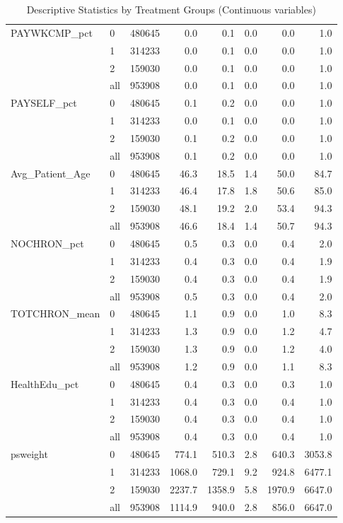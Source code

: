 \begin{table}[ht]
{\begin{tabular}{llrrrrrr}
   \hline
PAYWKCMP\_pct & 0 & 480645 &    0.0 &    0.1 & 0.0 &    0.0 &    1.0 \\ 
   & 1 & 314233 &    0.0 &    0.1 & 0.0 &    0.0 &    1.0 \\ 
   & 2 & 159030 &    0.0 &    0.1 & 0.0 &    0.0 &    1.0 \\ 
   \hline
 & all & 953908 &    0.0 &    0.1 & 0.0 &    0.0 &    1.0 \\ 
   \hline
PAYSELF\_pct & 0 & 480645 &    0.1 &    0.2 & 0.0 &    0.0 &    1.0 \\ 
   & 1 & 314233 &    0.0 &    0.1 & 0.0 &    0.0 &    1.0 \\ 
   & 2 & 159030 &    0.1 &    0.2 & 0.0 &    0.0 &    1.0 \\ 
   \hline
 & all & 953908 &    0.1 &    0.2 & 0.0 &    0.0 &    1.0 \\ 
   \hline
Avg\_Patient\_Age & 0 & 480645 &   46.3 &   18.5 & 1.4 &   50.0 &   84.7 \\ 
   & 1 & 314233 &   46.4 &   17.8 & 1.8 &   50.6 &   85.0 \\ 
   & 2 & 159030 &   48.1 &   19.2 & 2.0 &   53.4 &   94.3 \\ 
   \hline
 & all & 953908 &   46.6 &   18.4 & 1.4 &   50.7 &   94.3 \\ 
   \hline
NOCHRON\_pct & 0 & 480645 &    0.5 &    0.3 & 0.0 &    0.4 &    2.0 \\ 
   & 1 & 314233 &    0.4 &    0.3 & 0.0 &    0.4 &    1.9 \\ 
   & 2 & 159030 &    0.4 &    0.3 & 0.0 &    0.4 &    1.9 \\ 
   \hline
 & all & 953908 &    0.5 &    0.3 & 0.0 &    0.4 &    2.0 \\ 
   \hline
TOTCHRON\_mean & 0 & 480645 &    1.1 &    0.9 & 0.0 &    1.0 &    8.3 \\ 
   & 1 & 314233 &    1.3 &    0.9 & 0.0 &    1.2 &    4.7 \\ 
   & 2 & 159030 &    1.3 &    0.9 & 0.0 &    1.2 &    4.0 \\ 
   \hline
 & all & 953908 &    1.2 &    0.9 & 0.0 &    1.1 &    8.3 \\ 
   \hline
HealthEdu\_pct & 0 & 480645 &    0.4 &    0.3 & 0.0 &    0.3 &    1.0 \\ 
   & 1 & 314233 &    0.4 &    0.3 & 0.0 &    0.4 &    1.0 \\ 
   & 2 & 159030 &    0.4 &    0.3 & 0.0 &    0.4 &    1.0 \\ 
   \hline
 & all & 953908 &    0.4 &    0.3 & 0.0 &    0.4 &    1.0 \\ 
   \hline
psweight & 0 & 480645 &  774.1 &  510.3 & 2.8 &  640.3 & 3053.8 \\ 
   & 1 & 314233 & 1068.0 &  729.1 & 9.2 &  924.8 & 6477.1 \\ 
   & 2 & 159030 & 2237.7 & 1358.9 & 5.8 & 1970.9 & 6647.0 \\ 
   \hline
 & all & 953908 & 1114.9 &  940.0 & 2.8 &  856.0 & 6647.0 \\ 
   \hline
\end{tabular}
}
\caption{Descriptive Statistics by Treatment Groups (Continuous variables)} 
\label{tab:descriptive.2}
\end{table}
